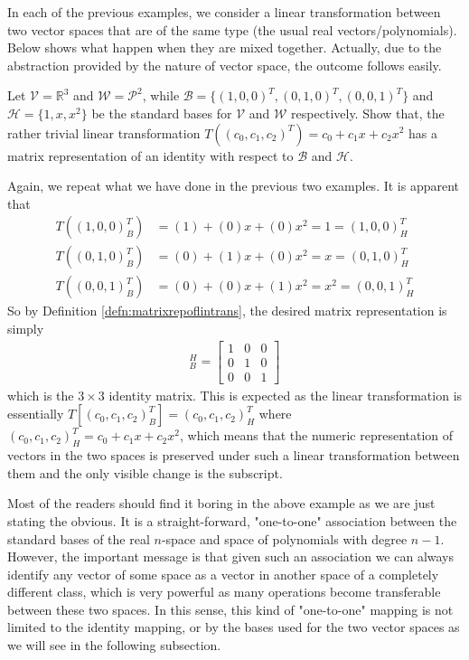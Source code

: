 In each of the previous examples, we consider a linear transformation between two vector spaces that are of the same type (the usual real vectors/polynomials). Below shows what happen when they are mixed together. Actually, due to the abstraction provided by the nature of vector space, the outcome follows easily.
\begin{exmp}
Let $\mathcal{V} = \mathbb{R}^3$ and $\mathcal{W} = \mathcal{P}^2$, while $\mathcal{B} = \{(1,0,0)^T, (0,1,0)^T, (0,0,1)^T\}$ and $\mathcal{H} = \{1, x, x^2\}$ be the standard bases for $\mathcal{V}$ and $\mathcal{W}$ respectively. Show that, the rather trivial linear transformation $T((c_0, c_1, c_2)^T) = c_0 + c_1x + c_2x^2$ has a matrix representation of an identity with respect to $\mathcal{B}$ and $\mathcal{H}$.
\end{exmp}
\begin{solution}
Again, we repeat what we have done in the previous two examples. It is apparent that
\begin{align*}
T((1,0,0)^T_B) &= (1) + (0)x + (0)x^2 = 1 = (1,0,0)^T_H\\
T((0,1,0)^T_B) &= (0) + (1)x + (0)x^2 = x = (0,1,0)^T_H\\
T((0,0,1)^T_B) &= (0) + (0)x + (1)x^2 = x^2 = (0,0,1)^T_H
\end{align*}
So by Definition \ref{defn:matrixrepoflintrans}, the desired matrix representation is simply
\begin{align*}
[T]_B^H = 
\begin{bmatrix}
1 & 0 & 0 \\
0 & 1 & 0 \\
0 & 0 & 1
\end{bmatrix}
\end{align*}
which is the $3 \times 3$ identity matrix. This is expected as the linear transformation is essentially $T[(c_0, c_1, c_2)_B^T] = (c_0, c_1, c_2)_H^T$ where $(c_0, c_1, c_2)_H^T = c_0 + c_1x + c_2x^2$, which means that the numeric representation of vectors in the two spaces is preserved under such a linear transformation between them and the only visible change is the subscript.
\end{solution}
Most of the readers should find it boring in the above example as we are just stating the obvious. It is a straight-forward, "one-to-one" association between the standard bases of the real $n$-space and space of polynomials with degree $n-1$. However, the important message is that given such an association we can always identify any vector of some space as a vector in another space of a completely different class, which is very powerful as many operations become transferable between these two spaces. In this sense, this kind of "one-to-one" mapping is not limited to the identity mapping, or by the bases used for the two vector spaces as we will see in the following subsection.

